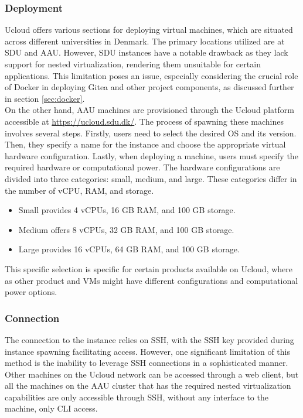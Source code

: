 \subsubsection{Deployment}
\label{sec:deployment-ucloud}
\ac{Ucloud} offers various sections for deploying virtual machines, which are situated across different universities in Denmark. 
The primary locations utilized are at \ac{SDU} and \ac{AAU}. However, \ac{SDU} instances have a notable drawback as they lack support for nested virtualization, 
rendering them unsuitable for certain applications. This limitation poses an issue, 
especially considering the crucial role of Docker in deploying Gitea and other project components, as discussed further in section \ref{sec:docker}.\\
On the other hand, \ac{AAU} machines are provisioned through the \ac{Ucloud} platform accessible at \url{https://ucloud.sdu.dk/}. 
The process of spawning these machines involves several steps. Firstly, users need to select the desired \ac{OS} and its version. 
Then, they specify a name for the instance and choose the appropriate virtual hardware configuration. Lastly, when deploying a machine, 
users must specify the required hardware or computational power. The hardware configurations are divided into three categories: 
small, medium, and large. These categories differ in the number of \ac{vCPU}, \ac{RAM}, and storage.
\begin{itemize}
    \item Small provides 4 vCPUs, 16 GB RAM, and 100 GB storage.
    \item Medium offers 8 vCPUs, 32 GB RAM, and 100 GB storage.
    \item Large provides 16 vCPUs, 64 GB RAM, and 100 GB storage.
\end{itemize}
This specific selection is specific for certain products available on \ac{Ucloud}, where as 
other product and \ac{VM}s might have different configurations and computational power options.

\subsubsection{Connection}
\label{sec:connection-ucloud}
The connection to the instance relies on \ac{SSH}, with the \ac{SSH} key provided during instance spawning facilitating access. 
However, one significant limitation of this method is the inability to leverage \ac{SSH} connections in a sophisticated manner. 
Other machines on the \ac{Ucloud} network can be accessed through a web client, but all the machines on the 
\ac{AAU} cluster that has the required nested virtualization capabilities are only accessible through \ac{SSH}, without any 
interface to the machine, only \ac{CLI} access.


